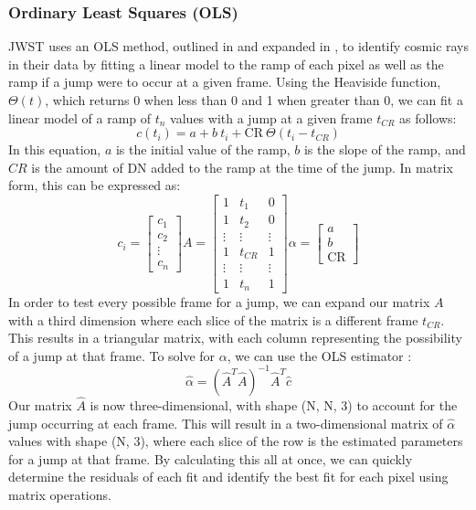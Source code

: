 \subsubsection{Ordinary Least Squares (OLS)}
JWST uses an OLS method, outlined in \cite{robberto2014generalized} and expanded in \cite{robberto2015cr}, to identify cosmic rays in their data by fitting a linear model to the ramp of each pixel as well as the ramp if a jump were to occur at a given frame.
Using the Heaviside function, $\Theta(t)$, which returns 0 when less than 0 and 1 when greater than 0, we can fit a linear model of a ramp of $t_n$ values with a jump at a given frame $t_{CR}$ as follows:
\begin{equation}
    c(t_i) = a + b\ t_i + \text{CR}\ \Theta(t_i - t_{CR})
\end{equation}
In this equation, $a$ is the initial value of the ramp, $b$ is the slope of the ramp, and $CR$ is the amount of DN added to the ramp at the time of the jump.
In matrix form, this can be expressed as:
\begin{equation}
    c_i = \begin{bmatrix}
        c_1 \\
        c_2 \\
        \vdots \\
        c_n
    \end{bmatrix}
    A = \begin{bmatrix}
        1 & t_1 & 0 \\
        1 & t_2 & 0 \\
        \vdots & \vdots & \vdots \\
        1 & t_{CR} & 1 \\
        \vdots & \vdots & \vdots \\
        1 & t_n & 1
    \end{bmatrix}
    \alpha = \begin{bmatrix}
        a \\ b \\ \text{CR}
    \end{bmatrix}
\end{equation}
In order to test every possible frame for a jump, we can expand our matrix $A$ with a third dimension where each slice of the matrix is a different frame $t_{CR}$.
This results in a triangular matrix, with each column representing the possibility of a jump at that frame.
To solve for $\alpha$, we can use the OLS estimator \parencite{puntanen1989equality}:
\begin{equation}
    \hat{\alpha} = (\hat{A}^T \hat{A})^{-1} \hat{A}^T \hat{c}
\end{equation}
Our matrix $\hat{A}$ is now three-dimensional, with shape (N, N, 3) to account for the jump occurring at each frame.
This will result in a two-dimensional matrix of $\hat{\alpha}$ values with shape (N, 3), where each slice of the row is the estimated parameters for a jump at that frame.
By calculating this all at once, we can quickly determine the residuals of each fit and identify the best fit for each pixel using matrix operations.

